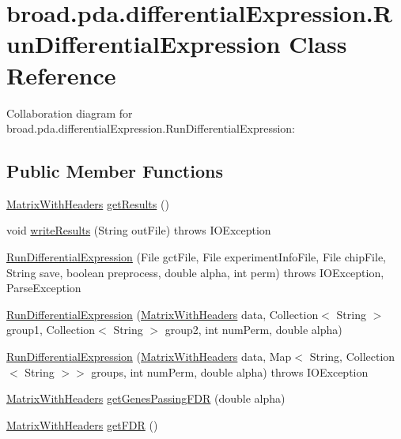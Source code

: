 \hypertarget{classbroad_1_1pda_1_1differential_expression_1_1_run_differential_expression}{\section{broad.\+pda.\+differential\+Expression.\+Run\+Differential\+Expression Class Reference}
\label{classbroad_1_1pda_1_1differential_expression_1_1_run_differential_expression}
}


Collaboration diagram for broad.\+pda.\+differential\+Expression.\+Run\+Differential\+Expression\+:
\subsection*{Public Member Functions}
\begin{DoxyCompactItemize}
\item 
\hyperlink{classbroad_1_1core_1_1datastructures_1_1_matrix_with_headers}{Matrix\+With\+Headers} \hyperlink{classbroad_1_1pda_1_1differential_expression_1_1_run_differential_expression_a1d50d6f1bd2701f326827fc3af431e8b}{get\+Results} ()
\item 
void \hyperlink{classbroad_1_1pda_1_1differential_expression_1_1_run_differential_expression_acffc5b6663c41061b126f27746671a0e}{write\+Results} (String out\+File)  throws I\+O\+Exception 
\item 
\hyperlink{classbroad_1_1pda_1_1differential_expression_1_1_run_differential_expression_a844f42ad88a9b879ee02093eccc26589}{Run\+Differential\+Expression} (File gct\+File, File experiment\+Info\+File, File chip\+File, String save, boolean preprocess, double alpha, int perm)  throws I\+O\+Exception, Parse\+Exception
\item 
\hyperlink{classbroad_1_1pda_1_1differential_expression_1_1_run_differential_expression_ae6c2b622775bbffaf64c1e66743e37c4}{Run\+Differential\+Expression} (\hyperlink{classbroad_1_1core_1_1datastructures_1_1_matrix_with_headers}{Matrix\+With\+Headers} data, Collection$<$ String $>$ group1, Collection$<$ String $>$ group2, int num\+Perm, double alpha)
\item 
\hyperlink{classbroad_1_1pda_1_1differential_expression_1_1_run_differential_expression_a6f344924d6eb0002ce78bf1695da7580}{Run\+Differential\+Expression} (\hyperlink{classbroad_1_1core_1_1datastructures_1_1_matrix_with_headers}{Matrix\+With\+Headers} data, Map$<$ String, Collection$<$ String $>$$>$ groups, int num\+Perm, double alpha)  throws I\+O\+Exception 
\item 
\hyperlink{classbroad_1_1core_1_1datastructures_1_1_matrix_with_headers}{Matrix\+With\+Headers} \hyperlink{classbroad_1_1pda_1_1differential_expression_1_1_run_differential_expression_aca16939cef4d396c0f7ff7fb4acb1bd1}{get\+Genes\+Passing\+F\+D\+R} (double alpha)
\item 
\hyperlink{classbroad_1_1core_1_1datastructures_1_1_matrix_with_headers}{Matrix\+With\+Headers} \hyperlink{classbroad_1_1pda_1_1differential_expression_1_1_run_differential_expression_a3e1b89e0a26f78383d03fa7aab42ddfe}{get\+F\+D\+R} ()
\end{DoxyCompactItemize}
